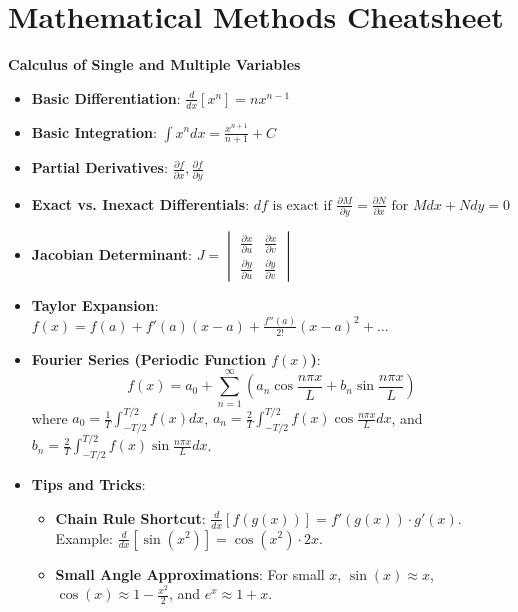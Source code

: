 \documentclass[a4paper,10pt]{article}
\begin{document}
\section*{Mathematical Methods Cheatsheet}

\textbf{Calculus of Single and Multiple Variables}
\begin{itemize}
    \item \textbf{Basic Differentiation}: \( \frac{d}{dx} [x^n] = n x^{n-1} \)
    \item \textbf{Basic Integration}: \( \int x^n dx = \frac{x^{n+1}}{n+1} + C \)
    \item \textbf{Partial Derivatives}: \( \frac{\partial f}{\partial x}, \frac{\partial f}{\partial y} \)
    \item \textbf{Exact vs. Inexact Differentials}: \( df \text{ is exact if } \frac{\partial M}{\partial y} = \frac{\partial N}{\partial x} \text{ for } Mdx + Ndy = 0 \)
    \item \textbf{Jacobian Determinant}: \( J = \begin{vmatrix} \frac{\partial x}{\partial u} & \frac{\partial x}{\partial v} \\
    \frac{\partial y}{\partial u} & \frac{\partial y}{\partial v} \end{vmatrix} \)
    \item \textbf{Taylor Expansion}: \( f(x) = f(a) + f'(a)(x-a) + \frac{f''(a)}{2!}(x-a)^2 + \dots \)
    \item \textbf{Fourier Series (Periodic Function \(f(x)\))}: 
    \[ f(x) = a_0 + \sum_{n=1}^{\infty} \left( a_n \cos\frac{n\pi x}{L} + b_n \sin\frac{n\pi x}{L} \right) \]
    where \( a_0 = \frac{1}{T} \int_{-T/2}^{T/2} f(x)dx \), \( a_n = \frac{2}{T} \int_{-T/2}^{T/2} f(x)\cos\frac{n\pi x}{L} dx \), and \( b_n = \frac{2}{T} \int_{-T/2}^{T/2} f(x)\sin\frac{n\pi x}{L} dx \).
    \item \textbf{Tips and Tricks}:
    \begin{itemize}
        \item \textbf{Chain Rule Shortcut}: \( \frac{d}{dx}[f(g(x))] = f'(g(x)) \cdot g'(x) \). Example: \( \frac{d}{dx}[\sin(x^2)] = \cos(x^2) \cdot 2x \).
        \item \textbf{Small Angle Approximations}: For small \( x \), \( \sin(x) \approx x \), \( \cos(x) \approx 1 - \frac{x^2}{2} \), and \( e^x \approx 1 + x \).
    \end{itemize}
\end{itemize}
\end{document}
